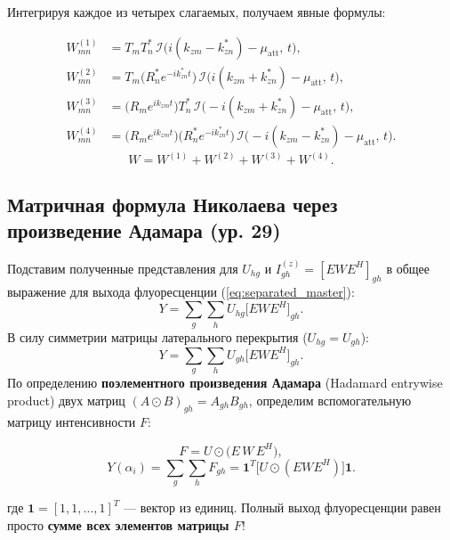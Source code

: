 \documentclass[a4paper,11pt]{article}
\begin{document}
Интегрируя каждое из четырех слагаемых, получаем явные формулы:
\begin{mathbox}
\begin{align}
    W_{mn}^{(1)} &= T_m T_n^* \, \mathcal{I}\big( i(k_{zm} - k_{zn}^*) - \mu_{\text{att}}, \, t \big), \label{eq:w1} \\[0.5em]
    W_{mn}^{(2)} &= T_m \big(R_n^* e^{-i k_{zn}^* t}\big) \, \mathcal{I}\big( i(k_{zm} + k_{zn}^*) - \mu_{\text{att}}, \, t \big), \label{eq:w2} \\[0.5em]
    W_{mn}^{(3)} &= \big(R_m e^{i k_{zm} t}\big) T_n^* \, \mathcal{I}\big( -i(k_{zm} + k_{zn}^*) - \mu_{\text{att}}, \, t \big), \label{eq:w3} \\[0.5em]
    W_{mn}^{(4)} &= \big(R_m e^{i k_{zm} t}\big) \big(R_n^* e^{-i k_{zn}^* t}\big) \, \mathcal{I}\big( -i(k_{zm} - k_{zn}^*) - \mu_{\text{att}}, \, t \big). \label{eq:w4}
\end{align}
\begin{equation}
    W = W^{(1)} + W^{(2)} + W^{(3)} + W^{(4)}.
    \label{eq:w_sum}
\end{equation}
\end{mathbox}

\subsection{Матричная формула Николаева через произведение Адамара (ур. 29)}

Подставим полученные представления для $U_{hg}$ и $I_{gh}^{(z)} = [E W E^H]_{gh}$ в общее выражение для выхода флуоресценции (\ref{eq:separated_master}):
\begin{equation}
    Y = \sum_{g} \sum_{h} U_{hg} \big[ E W E^H \big]_{gh}.
\end{equation}
В силу симметрии матрицы латерального перекрытия ($U_{hg} = U_{gh}$):
\begin{equation}
    Y = \sum_{g} \sum_{h} U_{gh} \big[ E W E^H \big]_{gh}.
\end{equation}
По определению \textbf{поэлементного произведения Адамара} (Hadamard entrywise product) двух матриц $(A \odot B)_{gh} = A_{gh} B_{gh}$, определим вспомогательную матрицу интенсивности $F$:
\begin{mathbox}
\begin{equation}
    F = U \odot \big( E \, W \, E^H \big),
    \label{eq:nikolaev_29}
\end{equation}
\begin{equation}
    Y(\alpha_i) = \sum_{g} \sum_{h} F_{gh} = \mathbf{1}^T \big[ U \odot (E W E^H) \big] \mathbf{1}.
    \label{eq:nikolaev_yield_final}
\end{equation}
\end{mathbox}
где $\mathbf{1} = [1, 1, \dots, 1]^T$ — вектор из единиц. Полный выход флуоресценции равен просто \textbf{сумме всех элементов матрицы $F$}!
\end{document}
